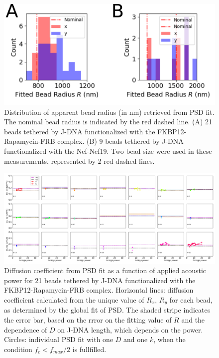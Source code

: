 \documentclass{biophys-new}
\begin{document}
\begin{figure}[hbt!]
	\centering
	\includegraphics[width=0.6\linewidth]{Figures/fig_Radius.png}
	\caption{Distribution of apparent bead radius (in nm) retrieved from PSD fit. The nominal bead radius is indicated by the red dashed line. (A) 21 beads tethered by J-DNA functionalized with the FKBP12-Rapamycin-FRB complex. (B) 9 beads tethered by J-DNA functionalized with the Nef-Nef19. Two bead size were used in these measurements, represented by 2 red dashed lines.}
	\label{fig:Rdiffusion}
\end{figure}

\begin{figure}
	\centering
	\centerline {\includegraphics[width=1\linewidth]{Figures/Power_Friction_Bis_Rapa.png}}
	\caption{%
		Diffusion coefficient from PSD fit as a function of applied acoustic power for 21 beads tethered by J-DNA functionalized with the FKBP12-Rapamycin-FRB complex. Horizontal lines: diffusion coefficient calculated from the unique value of $R_x$, $R_y$ for each bead, as determined by the global fit of PSD. The shaded stripe indicates the error bar, based on the rrror on the fitting value of $R$ and the dependence of $D$ on J-DNA length, which depends on the power. Circles: individual PSD fit with one $D$ and one $k$, when the condition $f_c < f_{max}/2$ is fullfilled.}
	\label{fig:PowerDiffusion}
\end{figure}
\end{document}
